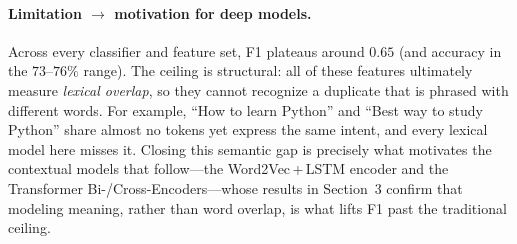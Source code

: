 \paragraph{Limitation $\rightarrow$ motivation for deep models.}
Across every classifier and feature set, F1 plateaus around $0.65$
(and accuracy in the $73$--$76\%$ range). The ceiling is structural: all of these
features ultimately measure \emph{lexical overlap}, so they cannot recognize a
duplicate that is phrased with different words. For example, ``How to learn
Python'' and ``Best way to study Python'' share almost no tokens yet express the
same intent, and every lexical model here misses it. Closing this semantic gap is
precisely what motivates the contextual models that follow---the Word2Vec\,+\,LSTM
encoder and the Transformer Bi-/Cross-Encoders---whose results in
Section~3 confirm that modeling meaning, rather than word overlap,
is what lifts F1 past the traditional ceiling.
